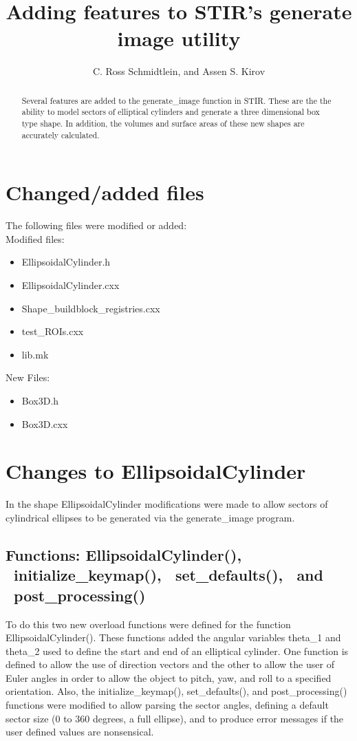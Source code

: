 \documentclass[10pt]{article}
\title{Adding features to STIR's generate image utility}
\author{C. Ross Schmidtlein, and Assen S. Kirov}
\begin{document}
\maketitle

\begin{abstract}
Several features are added to the generate\_image function in STIR.  These are the the ability to model sectors of elliptical cylinders and generate a three dimensional box type shape.  In addition, the volumes and surface areas of these new shapes are accurately calculated.
\end{abstract}

\section{Changed/added files}

The following files were modified or added:\\

\noindent Modified files:
\begin{itemize}
 pt
\item EllipsoidalCylinder.h 
\item EllipsoidalCylinder.cxx
\item Shape\_buildblock\_registries.cxx
\item test\_ROIs.cxx
\item lib.mk
\end{itemize}

\noindent New Files:
\begin{itemize}
 pt
\item Box3D.h
\item Box3D.cxx
\end{itemize}

\section{Changes to EllipsoidalCylinder}

In the shape EllipsoidalCylinder modifications were made to allow sectors of cylindrical ellipses to be generated via the generate\_image program.  

\subsection{Functions: EllipsoidalCylinder(), ~initialize\_keymap(), ~set\_defaults(), ~and ~post\_processing()}

To do this two new overload functions were defined for the function EllipsoidalCylinder().  These functions added the angular variables theta\_1 and theta\_2 used to define the start and end of an elliptical cylinder.  One function is defined to allow the use of direction vectors and the other to allow the user of Euler angles in order to allow the object to pitch, yaw, and roll to a specified orientation.  Also, the initialize\_keymap(), set\_defaults(), and post\_processing() functions were modified to allow parsing the sector angles, defining a default sector size (0 to 360 degrees, a full ellipse), and to produce error messages if the user defined values are nonsensical.  
\end{document}
